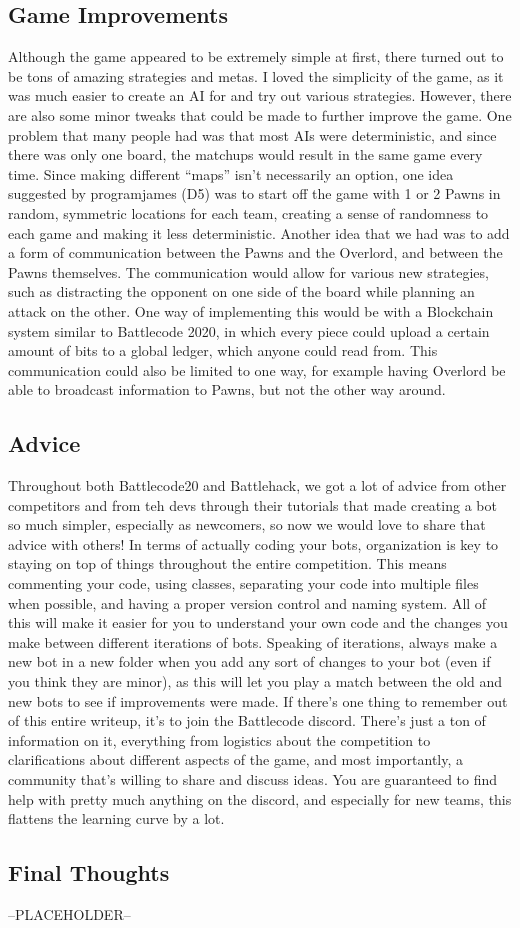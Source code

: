 \documentclass{article}
\begin{document}
\subsection{Game Improvements}
\hspace{\parindent}
Although the game appeared to be extremely simple at first, there turned out to be tons of amazing strategies and metas. I loved the simplicity of the game, as it was much easier to create an AI for and try out various strategies. However, there are also some minor tweaks that could be made to further improve the game. One problem that many people had was that most AIs were deterministic, and since there was only one board, the matchups would result in the same game every time. Since making different “maps” isn’t necessarily an option, one idea suggested by programjames (D5) was to start off the game with 1 or 2 Pawns in random, symmetric locations for each team, creating a sense of randomness to each game and making it less deterministic.
\bigbreak
Another idea that we had was to add a form of communication between the Pawns and the Overlord, and between the Pawns themselves. The communication would allow for various new strategies, such as distracting the opponent on one side of the board while planning an attack on the other. One way of implementing this would be with a Blockchain system similar to Battlecode 2020, in which every piece could upload a certain amount of bits to a global ledger, which anyone could read from. This communication could also be limited to one way, for example having Overlord be able to broadcast information to Pawns, but not the other way around.

\subsection{Advice}
\hspace{\parindent}
Throughout both Battlecode20 and Battlehack, we got a lot of advice from other competitors and from teh devs through their tutorials that made creating a bot so much simpler, especially as newcomers, so now we would love to share that advice with others!
\bigbreak
In terms of actually coding your bots, organization is key to staying on top of things throughout the entire competition. This means commenting your code, using classes, separating your code into multiple files when possible, and having a proper version control and naming system. All of this will make it easier for you to understand your own code and the changes you make between different iterations of bots. Speaking of iterations, always make a new bot in a new folder when you add any sort of changes to your bot (even if you think they are minor), as this will let you play a match between the old and new bots to see if improvements were made.
\bigbreak
If there’s one thing to remember out of this entire writeup, it’s to join the Battlecode discord. There’s just a ton of information on it, everything from logistics about the competition to clarifications about different aspects of the game, and most importantly, a community that’s willing to share and discuss ideas. You are guaranteed to find help with pretty much anything on the discord, and especially for new teams, this flattens the learning curve by a lot.

\subsection{Final Thoughts}
\hspace{\parindent}
--PLACEHOLDER--
\end{document}
